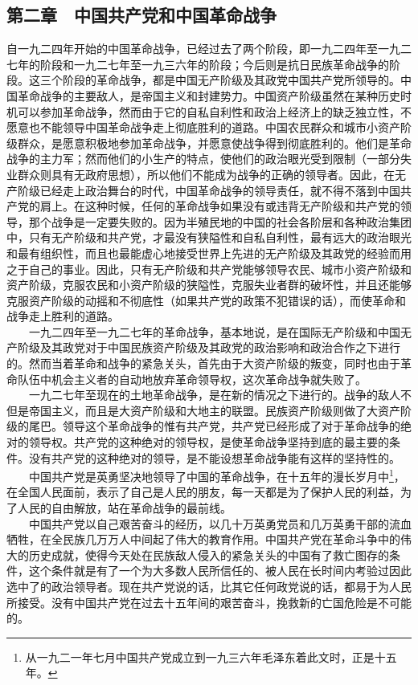 \documentclass[cn,11pt,chinese]{elegantbook}
\def\myformat#1{\hfil\hfil #1}
\begin{document}
\subsection*{\myformat{第二章　中国共产党和中国革命战争}}
自一九二四年开始的中国革命战争，已经过去了两个阶段，即一九二四年至一九二七年的阶段和一九二七年至一九三六年的阶段；今后则是抗日民族革命战争的阶段。这三个阶段的革命战争，都是中国无产阶级及其政党中国共产党所领导的。中国革命战争的主要敌人，是帝国主义和封建势力。中国资产阶级虽然在某种历史时机可以参加革命战争，然而由于它的自私自利性和政治上经济上的缺乏独立性，不愿意也不能领导中国革命战争走上彻底胜利的道路。中国农民群众和城市小资产阶级群众，是愿意积极地参加革命战争，并愿意使战争得到彻底胜利的。他们是革命战争的主力军；然而他们的小生产的特点，使他们的政治眼光受到限制（一部分失业群众则具有无政府思想），所以他们不能成为战争的正确的领导者。因此，在无产阶级已经走上政治舞台的时代，中国革命战争的领导责任，就不得不落到中国共产党的肩上。在这种时候，任何的革命战争如果没有或违背无产阶级和共产党的领导，那个战争是一定要失败的。因为半殖民地的中国的社会各阶层和各种政治集团中，只有无产阶级和共产党，才最没有狭隘性和自私自利性，最有远大的政治眼光和最有组织性，而且也最能虚心地接受世界上先进的无产阶级及其政党的经验而用之于自己的事业。因此，只有无产阶级和共产党能够领导农民、城市小资产阶级和资产阶级，克服农民和小资产阶级的狭隘性，克服失业者群的破坏性，并且还能够克服资产阶级的动摇和不彻底性（如果共产党的政策不犯错误的话），而使革命和战争走上胜利的道路。\\
　　一九二四年至一九二七年的革命战争，基本地说，是在国际无产阶级和中国无产阶级及其政党对于中国民族资产阶级及其政党的政治影响和政治合作之下进行的。然而当着革命和战争的紧急关头，首先由于大资产阶级的叛变，同时也由于革命队伍中机会主义者的自动地放弃革命领导权，这次革命战争就失败了。\\
　　一九二七年至现在的土地革命战争，是在新的情况之下进行的。战争的敌人不但是帝国主义，而且是大资产阶级和大地主的联盟。民族资产阶级则做了大资产阶级的尾巴。领导这个革命战争的惟有共产党，共产党已经形成了对于革命战争的绝对的领导权。共产党的这种绝对的领导权，是使革命战争坚持到底的最主要的条件。没有共产党的这种绝对的领导，是不能设想革命战争能有这样的坚持性的。\\
　　中国共产党是英勇坚决地领导了中国的革命战争，在十五年的漫长岁月中\footnote[3]{ 从一九二一年七月中国共产党成立到一九三六年毛泽东着此文时，正是十五年。}，在全国人民面前，表示了自己是人民的朋友，每一天都是为了保护人民的利益，为了人民的自由解放，站在革命战争的最前线。\\
　　中国共产党以自己艰苦奋斗的经历，以几十万英勇党员和几万英勇干部的流血牺牲，在全民族几万万人中间起了伟大的教育作用。中国共产党在革命斗争中的伟大的历史成就，使得今天处在民族敌人侵入的紧急关头的中国有了救亡图存的条件，这个条件就是有了一个为大多数人民所信任的、被人民在长时间内考验过因此选中了的政治领导者。现在共产党说的话，比其它任何政党说的话，都易于为人民所接受。没有中国共产党在过去十五年间的艰苦奋斗，挽救新的亡国危险是不可能的。\\
\end{document}
